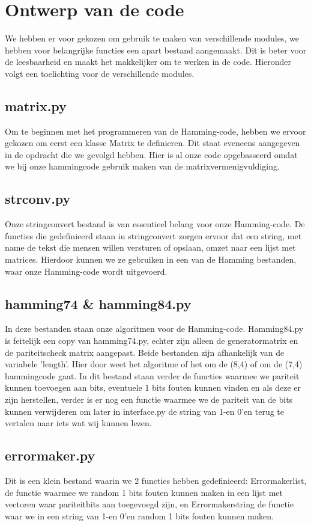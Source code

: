\documentclass[a4paper]{article}
\begin{document}
\section{Ontwerp van de code}
We hebben er voor gekozen om gebruik te maken van verschillende modules, we hebben voor belangrijke functies een apart bestand aangemaakt. Dit is beter voor de leesbaarheid en maakt het makkelijker om te werken in de code. Hieronder volgt een toelichting voor de verschillende modules.

\subsection{matrix.py}
	Om te beginnen met het programmeren van de Hamming-code, hebben we ervoor gekozen om eerst een klasse Matrix te definieren. Dit staat eveneens aangegeven in de opdracht die we gevolgd hebben. Hier is al onze code opgebasseerd omdat we bij onze hammingcode gebruik maken van de matrixvermenigvuldiging.

\subsection{strconv.py}
	Onze stringconvert bestand is van essentieel belang voor onze Hamming-code. De functies die gedefinieerd staan in stringconvert zorgen ervoor dat een string, met name de tekst die mensen willen versturen of opslaan, omzet naar een lijst met matrices. Hierdoor kunnen we ze gebruiken in een van de Hamming bestanden, waar onze Hamming-code wordt uitgevoerd.

\subsection{hamming74 \& hamming84.py}
	In deze bestanden staan onze algoritmen voor de Hamming-code. Hamming84.py is feitelijk een copy van hamming74.py, echter zijn alleen de generatormatrix en de pariteitscheck matrix aangepast. Beide bestanden zijn afhankelijk van de variabele 'length'. Hier door weet het algoritme of het om de (8,4) of om de (7,4) hammingcode gaat. In dit bestand staan verder de functies waarmee we pariteit kunnen toevoegen aan bits, eventuele 1 bits fouten kunnen vinden en als deze er zijn herstellen, verder is er nog een functie waarmee we de pariteit van de bits kunnen verwijderen om later in interface.py de string van 1-en 0'en terug te vertalen naar iets wat wij kunnen lezen.

\subsection{errormaker.py}
	Dit is een klein bestand waarin we 2 functies hebben gedefinieerd: Errormakerlist, de functie waarmee we random 1 bits fouten kunnen maken in een lijst met vectoren waar pariteitbits aan toegevoegd zijn, en Errormakerstring de functie waar we in een string van 1-en 0'en random 1 bits fouten kunnen maken.	
\end{document}
